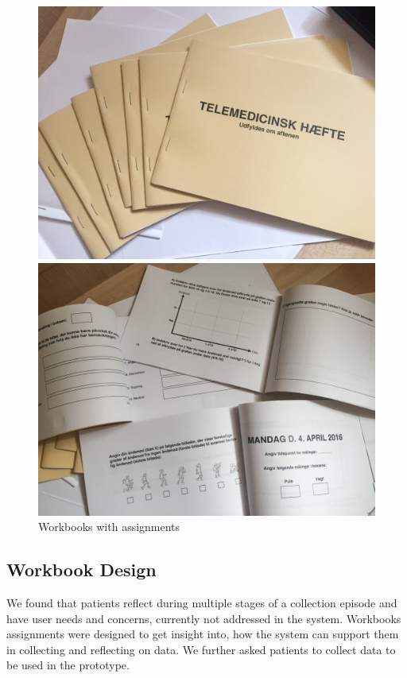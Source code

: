 \begin{figure}[!htb]
  \centering
  \begin{minipage}[b]{0.23\textwidth}
    \includegraphics[width=\textwidth]{img/workbook}
  \end{minipage}
  \hfill
  \begin{minipage}[b]{0.23\textwidth}
    \includegraphics[width=\textwidth]{img/workbook2}
  \end{minipage}
   \caption{Workbooks with assignments}
\end{figure}

\subsection{Workbook Design}
We found that patients reflect during multiple stages of a collection episode and have user needs and concerns, currently not addressed in the system. Workbooks assignments were designed to get insight into, how the system can support them in collecting and reflecting on data. We further asked patients to collect data to be used in the prototype. 

